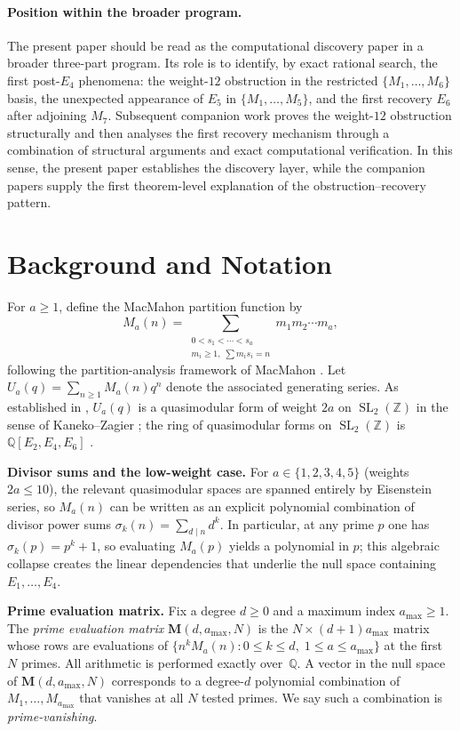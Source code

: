 \documentclass[11pt]{article}
\newcommand{\Q}{\mathbb{Q}}
\newcommand{\SL}{\operatorname{SL}}
\begin{document}
\paragraph{Position within the broader program.}
The present paper should be read as the computational discovery paper in a broader
three-part program.
Its role is to identify, by exact rational search, the first post-$E_4$ phenomena: the
weight-$12$ obstruction in the restricted $\{M_1,\dots,M_6\}$ basis, the unexpected
appearance of $E_5$ in $\{M_1,\dots,M_5\}$, and the first recovery $E_6$ after adjoining
$M_7$.
Subsequent companion work proves the weight-$12$ obstruction structurally and then analyses
the first recovery mechanism through a combination of structural arguments and exact
computational verification.
In this sense, the present paper establishes the discovery layer, while the companion
papers supply the first theorem-level explanation of the obstruction--recovery pattern.

\section{Background and Notation}
\label{sec:background}

For $a\ge 1$, define the MacMahon partition function by
\begin{equation}
\label{eq:Ma-def}
M_a(n)=\sum_{\substack{0<s_1<\cdots<s_a \\ m_i\ge 1,\; \sum m_i s_i=n}} m_1m_2\cdots m_a,
\end{equation}
following the partition-analysis framework of MacMahon \cite{MacMahon1915}.
Let $U_a(q)=\sum_{n\ge 1} M_a(n)q^n$ denote the associated generating series.
As established in \cite{CIO2024}, $U_a(q)$ is a quasimodular form of weight $2a$ on
$\SL_2(\mathbb{Z})$ in the sense of Kaneko--Zagier \cite{KZ1995};
the ring of quasimodular forms on $\SL_2(\mathbb{Z})$ is $\mathbb{Q}[E_2,E_4,E_6]$
\cite{Zagier1994}.

\textbf{Divisor sums and the low-weight case.}
For $a\in\{1,2,3,4,5\}$ (weights $2a\le 10$), the relevant quasimodular spaces are spanned
entirely by Eisenstein series, so $M_a(n)$ can be written as an explicit polynomial
combination of divisor power sums $\sigma_k(n)=\sum_{d\mid n}d^k$.
In particular, at any prime $p$ one has $\sigma_k(p)=p^k+1$, so evaluating $M_a(p)$ yields
a polynomial in $p$; this algebraic collapse creates the linear dependencies that underlie
the null space containing $E_1,\dots,E_4$.

\textbf{Prime evaluation matrix.}
Fix a degree $d\ge 0$ and a maximum index $a_{\max}\ge 1$.
The \emph{prime evaluation matrix} $\mathbf{M}(d,a_{\max},N)$ is the
$N\times(d+1)a_{\max}$ matrix whose rows are evaluations of
$\{n^k M_a(n):0\le k\le d,\; 1\le a\le a_{\max}\}$ at the first $N$ primes.
All arithmetic is performed exactly over~$\Q$.
A vector in the null space of $\mathbf{M}(d,a_{\max},N)$ corresponds to a degree-$d$
polynomial combination of $M_1,\dots,M_{a_{\max}}$ that vanishes at all $N$ tested primes.
We say such a combination is \emph{prime-vanishing}.
\end{document}
